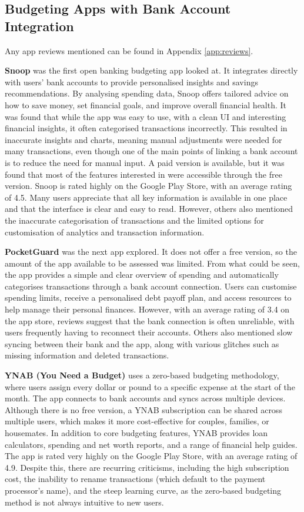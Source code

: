 \documentclass{l4proj}
\begin{document}
\begin{appendices}
\section{Budgeting Apps with Bank Account Integration}
Any app reviews mentioned can be found in Appendix \ref{app:reviews}.

\textbf{Snoop} was the first open banking budgeting app looked at. It integrates directly with users’ bank accounts to provide personalised insights and savings recommendations. By analysing spending data, Snoop offers tailored advice on how to save money, set financial goals, and improve overall financial health. It was found that while the app was easy to use, with a clean UI and interesting financial insights, it often categorised transactions incorrectly. This resulted in inaccurate insights and charts, meaning manual adjustments were needed for many transactions, even though one of the main points of linking a bank account is to reduce the need for manual input. A paid version is available, but it was found that most of the features interested in were accessible through the free version. Snoop is rated highly on the Google Play Store, with an average rating of 4.5. Many users appreciate that all key information is available in one place and that the interface is clear and easy to read. However, others also mentioned the inaccurate categorisation of transactions and the limited options for customisation of analytics and transaction information.

\textbf{PocketGuard} was the next app explored. It does not offer a free version, so the amount of the app available to be assessed was limited. From what could be seen, the app provides a simple and clear overview of spending and automatically categorises transactions through a bank account connection. Users can customise spending limits, receive a personalised debt payoff plan, and access resources to help manage their personal finances. However, with an average rating of 3.4 on the app store, reviews suggest that the bank connection is often unreliable, with users frequently having to reconnect their accounts. Others also mentioned slow syncing between their bank and the app, along with various glitches such as missing information and deleted transactions.

\textbf{YNAB (You Need a Budget)} uses a zero-based budgeting methodology, where users assign every dollar or pound to a specific expense at the start of the month. The app connects to bank accounts and syncs across multiple devices. Although there is no free version, a YNAB subscription can be shared across multiple users, which makes it more cost-effective for couples, families, or housemates. In addition to core budgeting features, YNAB provides loan calculators, spending and net worth reports, and a range of financial help guides. The app is rated very highly on the Google Play Store, with an average rating of 4.9. Despite this, there are recurring criticisms, including the high subscription cost, the inability to rename transactions (which default to the payment processor’s name), and the steep learning curve, as the zero-based budgeting method is not always intuitive to new users.


\end{appendices}
\end{document}
